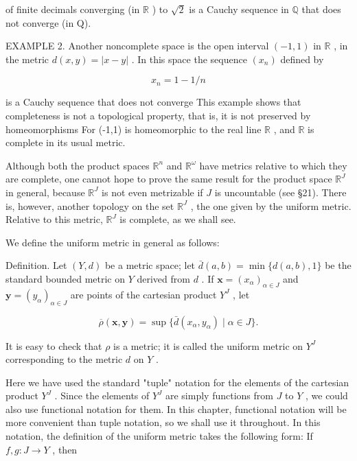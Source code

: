 \documentclass[10pt]{article}
\begin{document}
of finite decimals converging (in \(\mathbb{R}\) ) to \(\sqrt{2}\) is a Cauchy sequence in \(\mathbb{Q}\) that does not converge (in Q).

EXAMPLE 2. Another noncomplete space is the open interval \(\left( {-1,1}\right)\) in \(\mathbb{R}\) , in the metric \(d\left( {x,y}\right)  = \left| {x - y}\right|\) . In this space the sequence \(\left( {x}_{n}\right)\) defined by

\[
{x}_{n} = 1 - 1/n
\]

is a Cauchy sequence that does not converge This example shows that completeness is not a topological property, that is, it is not preserved by homeomorphisms For (-1,1) is homeomorphic to the real line \(\mathbb{R}\) , and \(\mathbb{R}\) is complete in its usual metric.

Although both the product spaces \({\mathbb{R}}^{n}\) and \({\mathbb{R}}^{\omega }\) have metrics relative to which they are complete, one cannot hope to prove the same result for the product space \({\mathbb{R}}^{J}\) in general, because \({\mathbb{R}}^{J}\) is not even metrizable if \(J\) is uncountable (see §21). There is, however, another topology on the set \({\mathbb{R}}^{J}\) , the one given by the uniform metric. Relative to this metric, \({\mathbb{R}}^{J}\) is complete, as we shall see.

We define the uniform metric in general as follows:

Definition. Let \(\left( {Y,d}\right)\) be a metric space; let \(\bar{d}\left( {a,b}\right)  = \min \{ d\left( {a,b}\right) ,1\}\) be the standard bounded metric on \(Y\) derived from \(d\) . If \(\mathbf{x} = {\left( {x}_{\alpha }\right) }_{\alpha  \in  J}\) and \(\mathbf{y} = {\left( {y}_{\alpha }\right) }_{\alpha  \in  J}\) are points of the cartesian product \({Y}^{J}\) , let

\[
\overline{\rho }\left( {\mathbf{x},\mathbf{y}}\right)  = \sup \{ \bar{d}\left( {{x}_{\alpha },{y}_{\alpha }}\right)  \mid  \alpha  \in  J\} .
\]

It is easy to check that \(\rho\) is a metric; it is called the uniform metric on \({Y}^{J}\) corresponding to the metric \(d\) on \(Y\) .

Here we have used the standard "tuple" notation for the elements of the cartesian product \({Y}^{J}\) . Since the elements of \({Y}^{J}\) are simply functions from \(J\) to \(Y\) , we could also use functional notation for them. In this chapter, functional notation will be more convenient than tuple notation, so we shall use it throughout. In this notation, the definition of the uniform metric takes the following form: If \(f,g : J \rightarrow  Y\) , then
\end{document}
